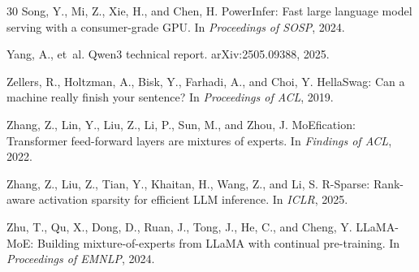 \documentclass[10pt,twocolumn,letterpaper]{article}
\begin{document}
\begin{thebibliography}{30}
Song, Y., Mi, Z., Xie, H., and Chen, H.
\newblock PowerInfer: Fast large language model serving with a consumer-grade GPU.
\newblock In \emph{Proceedings of SOSP}, 2024.

Yang, A., et~al.
\newblock Qwen3 technical report.
\newblock arXiv:2505.09388, 2025.

Zellers, R., Holtzman, A., Bisk, Y., Farhadi, A., and Choi, Y.
\newblock HellaSwag: Can a machine really finish your sentence?
\newblock In \emph{Proceedings of ACL}, 2019.

Zhang, Z., Lin, Y., Liu, Z., Li, P., Sun, M., and Zhou, J.
\newblock MoEfication: Transformer feed-forward layers are mixtures of experts.
\newblock In \emph{Findings of ACL}, 2022.

Zhang, Z., Liu, Z., Tian, Y., Khaitan, H., Wang, Z., and Li, S.
\newblock R-Sparse: Rank-aware activation sparsity for efficient LLM inference.
\newblock In \emph{ICLR}, 2025.

Zhu, T., Qu, X., Dong, D., Ruan, J., Tong, J., He, C., and Cheng, Y.
\newblock LLaMA-MoE: Building mixture-of-experts from LLaMA with continual pre-training.
\newblock In \emph{Proceedings of EMNLP}, 2024.

\end{thebibliography}
\end{document}
